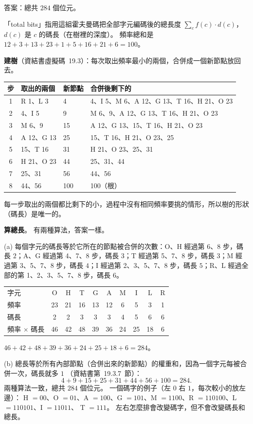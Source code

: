 \begin{pastsoln}
答案：總共 $284$ 個位元。

「total bits」指用這組霍夫曼碼把全部字元編碼後的總長度 $\sum_c f(c) \cdot d(c)$，$d(c)$ 是 $c$
的碼長（在樹裡的深度）。 頻率總和是 $12 + 3 + 13 + 23 + 1 + 5 + 16 + 21 + 6 = 100$。

\textbf{建樹}（資結書虛擬碼~19.3）：每次取出頻率最小的兩個，合併成一個新節點放回去。
\begin{center}
\begin{tabular}{clll}
\toprule
步 & 取出的兩個 & 新節點 & 合併後剩下的 \\
\midrule
1 & R 1、L 3 & 4 & 4、I 5、M 6、A 12、G 13、T 16、H 21、O 23 \\
2 & 4、I 5 & 9 & M 6、9、A 12、G 13、T 16、H 21、O 23 \\
3 & M 6、9 & 15 & A 12、G 13、15、T 16、H 21、O 23 \\
4 & A 12、G 13 & 25 & 15、T 16、H 21、O 23、25 \\
5 & 15、T 16 & 31 & H 21、O 23、25、31 \\
6 & H 21、O 23 & 44 & 25、31、44 \\
7 & 25、31 & 56 & 44、56 \\
8 & 44、56 & 100 & 100（根） \\
\bottomrule
\end{tabular}
\end{center}
每一步取出的兩個都比剩下的小，過程中沒有相同頻率要挑的情形，所以樹的形狀（碼長）是唯一的。

\textbf{算總長}。 有兩種算法，答案一樣。

(a) 每個字元的碼長等於它所在的節點被合併的次數：O、H 經過第 6、8 步，碼長 $2$；A、G 經過第 4、7、8
步，碼長 $3$；T 經過第 5、7、8 步，碼長 $3$；M 經過第 3、5、7、8 步，碼長 $4$；I 經過第 2、3、5、7、8
步，碼長 $5$；R、L 經過全部的第 1、2、3、5、7、8 步，碼長 $6$。
\begin{center}
\begin{tabular}{l*{9}{c}}
\toprule
字元 & O & H & T & G & A & M & I & L & R \\
頻率 & 23 & 21 & 16 & 13 & 12 & 6 & 5 & 3 & 1 \\
碼長 & 2 & 2 & 3 & 3 & 3 & 4 & 5 & 6 & 6 \\
頻率 $\times$ 碼長 & 46 & 42 & 48 & 39 & 36 & 24 & 25 & 18 & 6 \\
\bottomrule
\end{tabular}
\end{center}
$46 + 42 + 48 + 39 + 36 + 24 + 25 + 18 + 6 = 284$。

(b) 總長等於所有內部節點（合併出來的新節點）的權重和，因為一個字元每被合併一次，碼長就多 $1$
（資結書第~19.3.7~節）：
\[
4 + 9 + 15 + 25 + 31 + 44 + 56 + 100 = 284.
\]
兩種算法一致，總共 $284$ 個位元。 一個碼字的例子（左 $0$ 右 $1$，每次較小的放左邊）：
H $= 00$、O $= 01$、A $= 100$、G $= 101$、M $= 1100$、R $= 110100$、L $= 110101$、I $= 11011$、
T $= 111$。 左右怎麼排會改變碼字，但不會改變碼長和總長。
\end{pastsoln}

